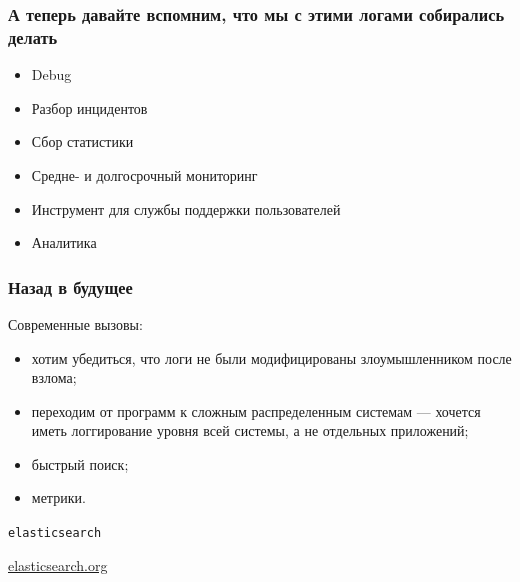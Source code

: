 \documentclass[aspectratio=169]{beamer}
\begin{document}
\begin{frame}
  \frametitle{А теперь давайте вспомним, что мы с этими логами собирались делать}

  \begin{itemize}
    \item Debug
    \item Разбор инцидентов
      \pause
    \item Сбор статистики
    \item Средне- и долгосрочный мониторинг
    \item Инструмент для службы поддержки пользователей
    \item Аналитика
  \end{itemize}
\end{frame}



\begin{frame}
  \frametitle{Назад в будущее}

  Современные вызовы:
  \begin{itemize}
  \item хотим убедиться, что логи не были модифицированы злоумышленником после взлома;
  \item переходим от программ к сложным распределенным системам --- хочется иметь логгирование уровня всей системы, а не отдельных приложений;
  \item быстрый поиск;
  \item метрики.
  \end{itemize}
  
\end{frame}


\begin{frame}
  \begin{center}
    {\Huge {\tt elasticsearch}} \par
    \url{elasticsearch.org}
  \end{center}
\end{frame}
\end{document}
